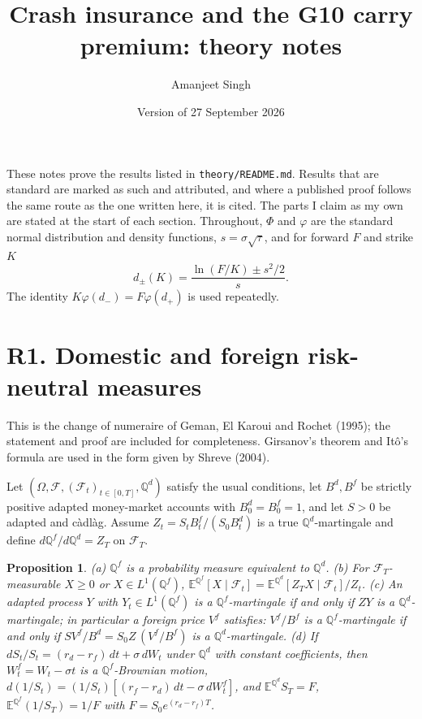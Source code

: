 \documentclass[11pt]{article}
\title{Crash insurance and the G10 carry premium: theory notes}
\author{Amanjeet Singh}
\date{Version of 27 September 2026}
\newtheorem{proposition}{Proposition}
\theoremstyle{remark}
\newcommand{\E}{\mathbb{E}}
\newcommand{\Q}{\mathbb{Q}}
\begin{document}
\maketitle

\noindent These notes prove the results listed in \texttt{theory/README.md}. Results that are standard are marked as such and attributed, and where a published proof follows the same route as the one written here, it is cited. The parts I claim as my own are stated at the start of each section. Throughout, $\Phi$ and $\varphi$ are the standard normal distribution and density functions, $s=\sigma\sqrt{\tau}$, and for forward $F$ and strike $K$
\[
d_\pm(K)=\frac{\ln(F/K)\pm s^2/2}{s}.
\]
The identity $K\varphi(d_-)=F\varphi(d_+)$ is used repeatedly.

\section*{R1. Domestic and foreign risk-neutral measures}

This is the change of numeraire of Geman, El Karoui and Rochet (1995); the statement and proof are included for completeness. Girsanov's theorem and It\^o's formula are used in the form given by Shreve (2004).

Let $(\Omega,\mathcal F,(\mathcal F_t)_{t\in[0,T]},\Q^d)$ satisfy the usual conditions, let $B^d,B^f$ be strictly positive adapted money-market accounts with $B^d_0=B^f_0=1$, and let $S>0$ be adapted and c\`adl\`ag. Assume $Z_t=S_tB^f_t/(S_0B^d_t)$ is a true $\Q^d$-martingale and define $d\Q^f/d\Q^d=Z_T$ on $\mathcal F_T$.

\begin{proposition}
(a) $\Q^f$ is a probability measure equivalent to $\Q^d$. (b) For $\mathcal F_T$-measurable $X\ge0$ or $X\in L^1(\Q^f)$, $\E^{\Q^f}[X\mid\mathcal F_t]=\E^{\Q^d}[Z_TX\mid\mathcal F_t]/Z_t$. (c) An adapted process $Y$ with $Y_t\in L^1(\Q^f)$ is a $\Q^f$-martingale if and only if $ZY$ is a $\Q^d$-martingale; in particular a foreign price $V^f$ satisfies: $V^f/B^f$ is a $\Q^f$-martingale if and only if $SV^f/B^d=S_0Z\,(V^f/B^f)$ is a $\Q^d$-martingale. (d) If $dS_t/S_t=(r_d-r_f)\,dt+\sigma\,dW_t$ under $\Q^d$ with constant coefficients, then $W^f_t=W_t-\sigma t$ is a $\Q^f$-Brownian motion, $d(1/S_t)=(1/S_t)[(r_f-r_d)\,dt-\sigma\,dW^f_t]$, and $\E^{\Q^d}S_T=F$, $\E^{\Q^f}(1/S_T)=1/F$ with $F=S_0e^{(r_d-r_f)T}$.
\end{proposition}
\end{document}
